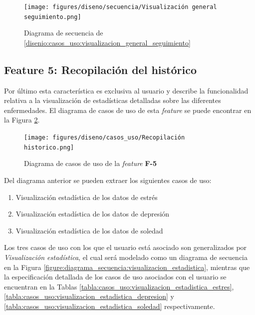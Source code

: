             \begin{figure}[h]
                \centering
                \texttt{[image: figures/diseno/secuencia/Visualización general seguimiento.png]}
                \caption{Diagrama de secuencia de \ref{disenio:casos_uso:visualizacion_general_seguimiento}}
                \label{figure:diagrama_secuencia:visualizacion_general_seguimiento}
            \end{figure}

            \clearpage  %
            
        \subsection*{Feature 5: Recopilación del histórico}
            Por último esta característica es exclusiva al usuario y describe la funcionalidad relativa a la visualización de estadísticas detalladas sobre las diferentes enfermedades. El diagrama de casos de uso de esta \textit{feature} se puede encontrar en la Figura \ref{figure:diagrama_casos_uso:f5}.

            \begin{figure}[h]
                \centering
                \texttt{[image: figures/diseno/casos\_uso/Recopilación historico.png]}
                \caption{Diagrama de casos de uso de la \textit{feature} \textbf{F-5}}
                \label{figure:diagrama_casos_uso:f5}
            \end{figure}

             Del diagrama anterior se pueden extraer los siguientes casos de uso:

            \begin{enumerate}[resume=casos-uso,label=\textbf{\texttt{CU-\arabic*}}]
                \item \label{disenio:casos_uso:visualizacion_estadistica_estres} Visualización estadística de los datos de estrés
                \item \label{disenio:casos_uso:visualizacion_estadistica_depresion} Visualización estadística de los datos de depresión
                \item \label{disenio:casos_uso:visualizacion_estadistica_soledad} Visualización estadística de los datos de soledad
            \end{enumerate}

            Los tres casos de uso con los que el usuario está asociado son generalizados por \textit{Visualización estadística}, el cual será modelado como un diagrama de secuencia en la Figura \ref{figure:diagrama_secuencia:visualizacion_estadistica}, mientras que la especificación detallada de los casos de uso asociados con el usuario se encuentran en la Tablas \ref{tabla:casos_uso:visualizacion_estadistica_estres}, \ref{tabla:casos_uso:visualizacion_estadistica_depresion} y \ref{tabla:casos_uso:visualizacion_estadistica_soledad} respectivamente.

